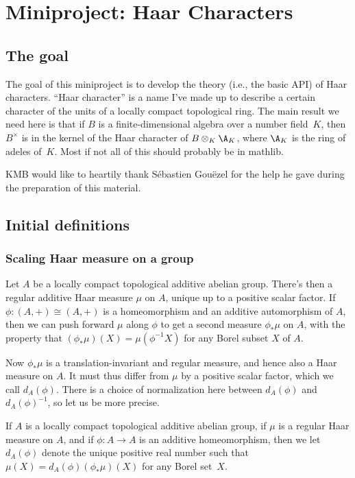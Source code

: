 \chapter{Miniproject: Haar Characters}\label{Haar_char_project}

\section{The goal}

The goal of this miniproject is to develop the theory (i.e., the basic API) of Haar characters.
``Haar character'' is a name I've made up to describe a certain character of the units of a locally
compact topological ring. The main result we need here is that if $B$ is a finite-dimensional
algebra over a number field~$K$, then $B^\times$ is in the kernel of the Haar character
of $B\otimes_K\A_K$, where $\A_K$ is the ring of adeles of~$K$. Most if not all of this
should probably be in mathlib.

KMB would like to heartily thank S\'ebastien Gou\"ezel for the help he gave during the preparation
of this material.

\section{Initial definitions}

\subsection{Scaling Haar measure on a group}

Let $A$ be a locally compact topological additive abelian group. There's then a regular additive
Haar measure $\mu$ on $A$, unique up to a positive scalar factor. If $\phi:(A,+)\cong(A,+)$ is a
homeomorphism and an additive automorphism of $A$, then we can push forward $\mu$
along $\phi$ to get a second measure $\phi_*\mu$ on $A$, with the property that
$(\phi_*\mu)(X)=\mu(\phi^{-1}X)$ for any Borel subset $X$ of $A$.

Now $\phi_*\mu$ is a translation-invariant and regular measure,
and hence also a Haar measure on $A.$ It must thus differ from
$\mu$ by a positive scalar factor, which we call $d_A(\phi)$.
There is a choice of normalization here between $d_A(\phi)$
and $d_A(\phi)^{-1}$, so let us be more precise.

\begin{definition}
  \label{MeasureTheory.addEquivAddHaarChar}
  \leanok
  If $A$ is a locally compact topological additive abelian group,
  if $\mu$ is a regular Haar measure on $A$, and if $\phi:A\to A$ is an
  additive homeomorphism, then we let $d_A(\phi)$ denote the unique positive
  real number such that $\mu(X)=d_A(\phi)(\phi_*\mu)(X)$ for any Borel set~$X$.
\end{definition}

